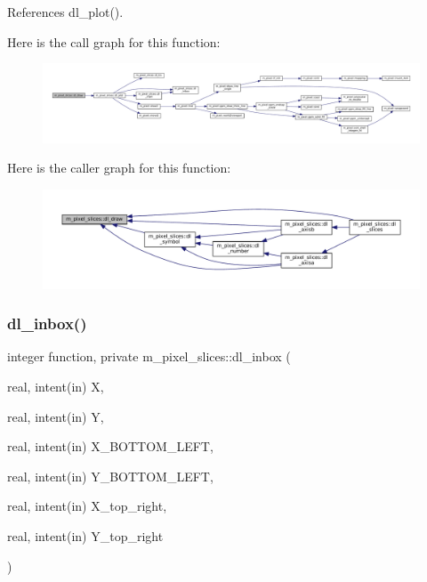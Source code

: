 References dl\+\_\+plot().

Here is the call graph for this function\+:\nopagebreak
\begin{figure}[H]
\begin{center}
\leavevmode
\includegraphics[width=350pt]{namespacem__pixel__slices_acafdf0174290a0e231ca120f6305b5d0_cgraph}
\end{center}
\end{figure}
Here is the caller graph for this function\+:\nopagebreak
\begin{figure}[H]
\begin{center}
\leavevmode
\includegraphics[width=350pt]{namespacem__pixel__slices_acafdf0174290a0e231ca120f6305b5d0_icgraph}
\end{center}
\end{figure}
\mbox{\label{namespacem__pixel__slices_aa0de53a25754eab8fff1732aa2f93eba}} 
\subsubsection{\texorpdfstring{dl\+\_\+inbox()}{dl\_inbox()}}
{\footnotesize\ttfamily integer function, private m\+\_\+pixel\+\_\+slices\+::dl\+\_\+inbox (\begin{DoxyParamCaption}\item[{real, intent(in)}]{X,  }\item[{real, intent(in)}]{Y,  }\item[{real, intent(in)}]{X\+\_\+\+B\+O\+T\+T\+O\+M\+\_\+\+L\+E\+FT,  }\item[{real, intent(in)}]{Y\+\_\+\+B\+O\+T\+T\+O\+M\+\_\+\+L\+E\+FT,  }\item[{real, intent(in)}]{X\+\_\+top\+\_\+right,  }\item[{real, intent(in)}]{Y\+\_\+top\+\_\+right }\end{DoxyParamCaption})\hspace{0.3cm}{\ttfamily [private]}}

